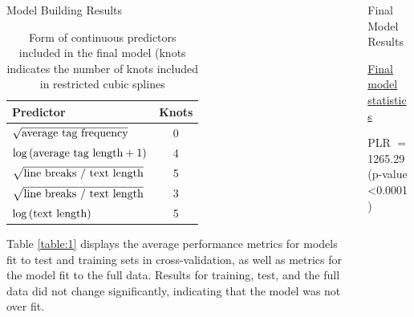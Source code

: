 \documentclass[final]{beamer}
\newlength{\onecolwid}
\newlength{\twocolwid}
\begin{document}
\begin{frame}[t]
\begin{columns}[t]
\begin{column}{\twocolwid}
\begin{columns}[t,totalwidth=\twocolwid]
\begin{column}{\onecolwid}
\begin{block}{Model Building Results}
\renewcommand{\arraystretch}{1.2} %
\begin{table}[!htbp]
\vspace{2ex}
\begin{tabular}{| l | c |}
    \hline
    \textbf{Predictor} & \textbf{Knots} \\
    \hline
    $\sqrt{\textnormal{average tag frequency}}$ & 0 \\
    $\log\left({\textnormal{average tag length} + 1}\right)$ & 4 \\
    $\sqrt{\textnormal{line breaks / text length}}$ & 5 \\
    $\sqrt{\textnormal{line breaks / text length}}$ & 3 \\
    $\log\left({\textnormal{text length}}\right)$ & 5 \\
    \hline
\end{tabular}
\caption{Form of continuous predictors included in the final model (knots indicates the number of knots included in restricted cubic splines}
\label{table:continuous}
\end{table}

Table \ref{table:1} displays the average performance metrics for models fit to test and training sets in cross-validation, as well as metrics for the model fit to the full data. Results for training, test, and the full data did not change significantly, indicating that the model was not over fit. 

\end{block}



\end{column} %

\begin{column}{\onecolwid}\vspace{-.6in} %


\begin{block}{Final Model Results}

\underline{Final model statistics} 

\textcolor{dblue!70}{} PLR $=$ 1265.29 (p-value \textless0.0001)


\end{block}
\end{column}
\end{columns}
\end{column}
\end{columns}
\end{frame}
\end{document}
